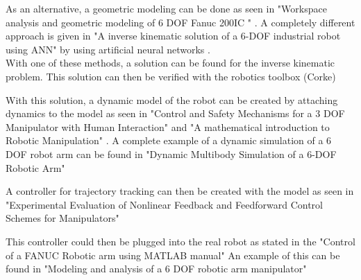 As an alternative, a geometric modeling can be done as seen in "Workspace analysis and geometric modeling of 6 DOF Fanuc 200IC " \cite{geomModelingKamel}. 
A completely different approach is given in "A inverse kinematic solution of  a 6-DOF industrial robot using ANN" by using artificial neural networks \cite{invKinANNKSHITISH}.\\
%
%
With one of these methods, a solution can be found for the inverse kinematic problem.
This solution can then be verified with the robotics toolbox (Corke)

With this solution, a dynamic model of the robot can be created by attaching dynamics to the model as seen in "Control and Safety Mechanisms for a 3 DOF Manipulator with Human Interaction" \cite{KongWei} and "A mathematical introduction to Robotic Manipulation" \cite{MathIntroRobManip}. A complete example of a dynamic simulation of a 6 \ac{DOF} robot arm can be found in "Dynamic Multibody Simulation of a 6-DOF Robotic Arm" \cite{Dyn6DOFBinLi}

A controller for trajectory tracking can then be created with the model as seen in "Experimental Evaluation of Nonlinear Feedback and Feedforward Control Schemes for Manipulators" \cite{evalNonlinFeedForBackControl}

This controller could then be plugged into the real robot as stated in the "Control of a FANUC Robotic arm using MATLAB manual"  \cite{FANUCcontrolMatlab} An example of this can be found in "Modeling and analysis of a 6 DOF robotic arm manipulator" \cite{RobotModelAnalContrexampleJamshed}
























